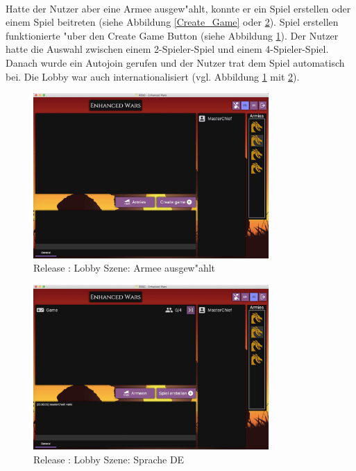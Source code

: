 \documentclass[12pt, titlepage]{scrartcl}
\newcommand{\RN}[1]{%
	\textup{\uppercase\expandafter{\romannumeral#1}}%
}
\begin{document}
			    \ \vspace{0.5cm} \\ Hatte der Nutzer aber eine Armee ausgew"ahlt, konnte er ein Spiel erstellen oder einem Spiel beitreten (siehe Abbildung \ref{Create_Game} oder \ref{Lobby_Language}). Spiel erstellen funktionierte "uber den Create Game Button (siehe Abbildung \ref{Lobby_Army_Selected}). Der Nutzer hatte die Auswahl zwischen einem 2-Spieler-Spiel und einem 4-Spieler-Spiel. Danach wurde ein Autojoin gerufen und der Nutzer trat dem Spiel automatisch bei. Die Lobby war auch internationalisiert (vgl. Abbildung \ref{Lobby_Army_Selected} mit \ref{Lobby_Language}). \\
			    \begin{figure}[H] 
    				\centering
    				\includegraphics[width=0.8\textwidth]{images/old_state/lobby/ArmySelected.png}
    				\caption{Release \RN{2}: Lobby Szene: Armee ausgew"ahlt}
    				\label{Lobby_Army_Selected}
			    \end{figure}
			    \begin{figure}[H] 
    				\centering
    				\includegraphics[width=0.8\textwidth]{images/old_state/lobby/International+Chat+GameCreated.png}
    				\caption{Release \RN{2}: Lobby Szene: Sprache DE}
    				\label{Lobby_Language}
			    \end{figure}
\end{document}
